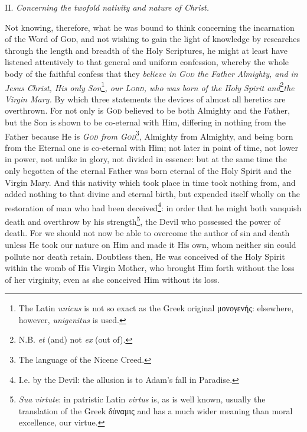 II. \emph{Concerning the twofold nativity and nature of Christ.}

Not knowing, therefore, what he was bound to think concerning the incarnation of the Word of \textsc{God}, and not wishing to gain the light of knowledge by researches through the length and breadth of the Holy Scriptures, he might at least have listened attentively to that general and uniform confession, whereby the whole body of the faithful confess that they \emph{believe in \textsc{God} the Father Almighty, and in Jesus Christ, His only Son}\footnote{The Latin \emph{unicus} is not so exact as the Greek original \textgreek{μονογενής}: elsewhere, however, \emph{unigenitus} is used.}\emph{, our \textsc{Lord}, who was born of the Holy Spirit and}\footnote{N.B. \emph{et} (and) not \emph{ex} (out of).}\emph{the Virgin Mary.} By which three statements the devices of almost all heretics are overthrown. For not only is \textsc{God} believed to be both Almighty and the Father, but the Son is shown to be co-eternal with Him, differing in nothing from the Father because He is \emph{\textsc{God} from \textsc{God}}\footnote{The language of the Nicene Creed.}, Almighty from Almighty, and being born from the Eternal one is co-eternal with Him; not later in point of time, not lower in power, not unlike in glory, not divided in essence: but at the same time the only begotten of the eternal Father was born eternal of the Holy Spirit and the Virgin Mary. And this nativity which took place in time took nothing from, and added nothing to that divine and eternal birth, but expended itself wholly on the restoration of man who had been deceived\footnote{I.e. by the Devil: the allusion is to Adam’s fall in Paradise.}: in order that he might both vanquish death and overthrow by his strength\footnote{\emph{Sua virtute}: in patristic Latin \emph{virtus} is, as is well known, usually the translation of the Greek \textgreek{δύναμις} and has a much wider meaning than moral excellence, our virtue.}, the Devil who possessed the power of death. For we should not now be able to overcome the author of sin and death unless He took our nature on Him and made it His own, whom neither sin could pollute nor death retain. Doubtless then, He was conceived of the Holy Spirit within the womb of His Virgin Mother, who brought Him forth without the loss of her virginity, even as she conceived Him without its loss.

